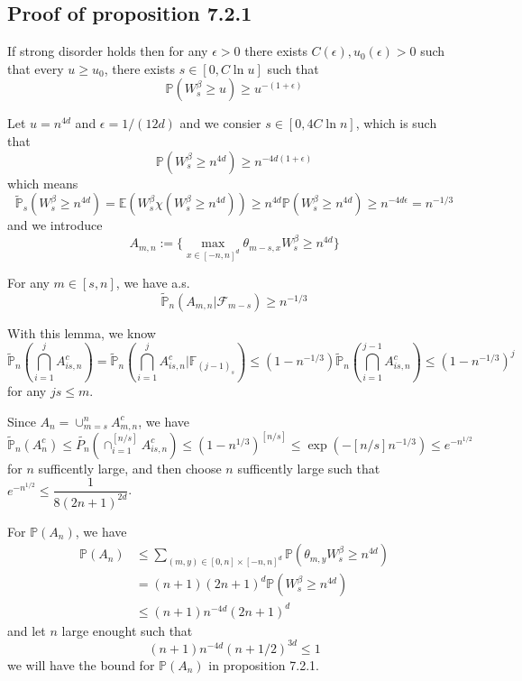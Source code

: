 \subsection{Proof of proposition 7.2.1}

\begin{proposition}
    If strong disorder holds then for any $\epsilon > 0$ there exists $C(\epsilon), u_0(\epsilon) > 0$ such that every $u\geq u_0$, there exists $s\in [0,C\ln u]$ such that
    \[
    \mathbb{P}(W_s^{\beta} \geq u) \geq u^{-(1+\epsilon)}
    \]
\end{proposition}

Let $u = n^{4d}$ and $\epsilon = 1/(12d)$ and we consier $s\in[0,4C\ln n]$, which is such that
\[
\mathbb{P}(W_s^{\beta} \geq n^{4d}) \geq n^{-4d(1+\epsilon)}
\]
which means
\[
\tilde{\mathbb{P}}_s(W_s^{\beta} \geq n^{4d}) = \mathbb{E}(W_s^{\beta} \chi(W_s^{\beta} \geq n^{4d})) \geq n^{4d}\mathbb{P}(W_s^{\beta} \geq n^{4d}) \geq n^{-4d\epsilon} = n^{-1/3}
\]
and we introduce
\[
A_{m,n}:= \{\max_{x\in[-n,n]^d}\theta_{m-s,x}W_s^{\beta} \geq n^{4d}\}
\]

\begin{lemma}
    For any $m \in [s,n]$, we have a.s.
    \[
    \tilde{\mathbb{P}}_n(A_{m,n}|\mathcal{F}_{m-s}) \geq n^{-1/3}
    \]
\end{lemma}

With this lemma, we know
\[
\tilde{\mathbb{P}}_n(\bigcap_{i=1}^j A_{is,n}^c) = \tilde{\mathbb{P}}_n(\bigcap_{i=1}^j A_{is,n}^c|\mathbb{F}_{(j-1)_s}) \leq (1-n^{-1/3})\tilde{\mathbb{P}}_n(\bigcap_{i=1}^{j-1} A_{is,n}^c) \leq (1-n^{-1/3})^j
\]
for any $js\leq m$.\par
Since $A_n = \cup_{m=s}^n A_{m,n}^c$, we have
\[
\tilde{\mathbb{P}}_n(A_n^c) \leq \tilde{P_n}(\cap_{i=1}^{[n/s]}A_{is,n}^c) \leq (1-n^{1/3})^{[n/s]} \leq \exp(-[n/s]n^{-1/3}) \leq e^{-n^{1/2}}
\]
for $n$ sufficently large, and then choose $n$ sufficently large such that $e^{-n^{1/2}} \leq \dfrac{1}{8(2n+1)^{2d}}$.\par
For $\mathbb{P}(A_n)$, we have
\[
\begin{aligned}
    \mathbb{P}(A_n) &\leq \sum\limits_{(m,y) \in [0,n]\times[-n,n]^d} \mathbb{P}(\theta_{m,y}W_s^{\beta} \geq n^{4d}) \\ &= (n+1)(2n+1)^d\mathbb{P}(W_s^{\beta} \geq n^{4d}) \\  &\leq (n+1)n^{-4d}(2n+1)^d
\end{aligned}
\]
and let $n$ large enought such that
\[
(n+1)n^{-4d}(n+1/2)^{3d} \leq 1
\]
we will have the bound for $\mathbb{P}(A_n)$ in proposition 7.2.1.\par
\vspace{0.5em}

